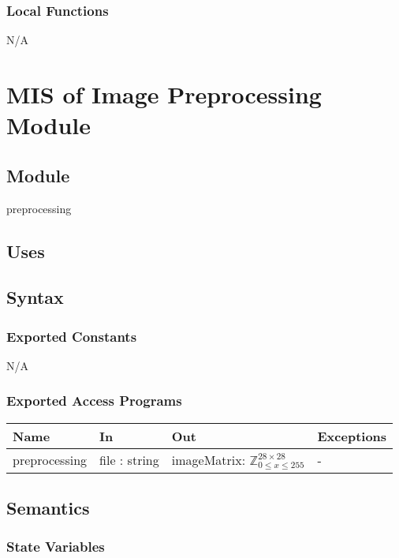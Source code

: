 \documentclass[12pt, titlepage]{article}
\begin{document}
\begin{itemize}
\subsubsection{Local Functions}

N/A

\section{MIS of Image Preprocessing Module} \label{mPreprocessing}

\subsection{Module}

preprocessing

\subsection{Uses}

\subsection{Syntax}

\subsubsection{Exported Constants}

N/A

\subsubsection{Exported Access Programs}

\begin{center}
\begin{tabular}{p{3cm} p{3cm} p{4cm} p{2cm}}
\hline
\textbf{Name} & \textbf{In} & \textbf{Out} & \textbf{Exceptions} \\
\hline
preprocessing & file : string & imageMatrix: $\mathbb{Z}^{28 \times 28}_{0 \le x \le 255}$ & - \\
\hline
\end{tabular}
\end{center}

\subsection{Semantics}

\subsubsection{State Variables}


\end{itemize}
\end{document}
